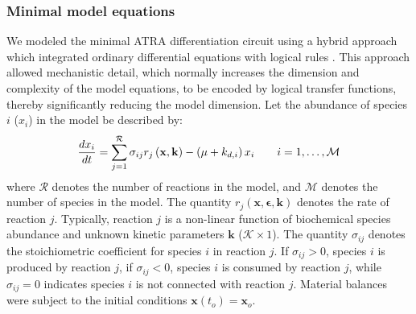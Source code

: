 \documentclass[10pt,twocolumn,twoside,final]{IEEEtran}
\begin{document}
\noindent\subsubsection*{Minimal model equations}
We modeled the minimal ATRA differentiation circuit using a hybrid approach which integrated ordinary differential equations with logical rules \cite{pr3010138}.
This approach allowed mechanistic detail, which normally increases the dimension and complexity of the model equations, to be encoded by logical transfer functions, thereby significantly reducing the model dimension. Let the abundance of species $i$ ($x_{i}$) in the model be described by:
\begin{equation}
	\frac{dx_{i}}{dt}  =  \sum_{j = 1}^{\mathcal{R}}\sigma_{ij}r_{j}\left(\mathbf{x},\mathbf{k}\right) - \left(\mu+k_{d,i}\right)x_{i}\qquad{i=1,\hdots,\mathcal{M}}\\
\end{equation}
where $\mathcal{R}$ denotes the number of reactions in the model, and $\mathcal{M}$ denotes the number of species in the model.
The quantity $r_{j}\left(\mathbf{x},\mathbf{\epsilon},\mathbf{k}\right)$ denotes the rate of reaction $j$.
Typically, reaction $j$ is a non-linear function of biochemical species abundance and unknown kinetic parameters $\mathbf{k}$ ($\mathcal{K}\times{1}$).
The quantity $\sigma_{ij}$ denotes the stoichiometric coefficient for species $i$ in reaction $j$.
If $\sigma_{ij}>0$, species $i$ is produced by reaction $j$, if $\sigma_{ij}<0$, species $i$ is consumed by reaction $j$,
while $\sigma_{ij} = 0$ indicates species $i$ is not connected with reaction $j$.
Material balances were subject to the initial conditions $\mathbf{x}\left(t_{o}\right) = \mathbf{x}_{o}$.
\end{document}

